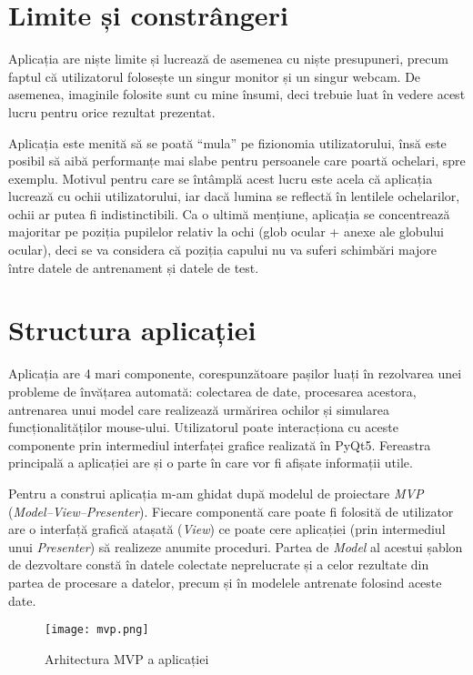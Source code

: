 \section{Limite și constrângeri}
Aplicația are niște limite și lucrează de asemenea cu niște presupuneri, precum faptul că utilizatorul folosește un singur monitor și un singur webcam.
De asemenea, imaginile folosite sunt cu mine însumi, deci trebuie luat în vedere acest lucru pentru orice rezultat prezentat.

Aplicația este menită să se poată ``mula'' pe fizionomia utilizatorului, însă este posibil să aibă performanțe mai slabe pentru persoanele care poartă ochelari, spre exemplu.
Motivul pentru care se întâmplă acest lucru este acela că aplicația lucrează cu ochii utilizatorului, iar dacă lumina se reflectă în lentilele ochelarilor, ochii ar putea fi indistinctibili.
Ca o ultimă mențiune, aplicația se concentrează majoritar pe poziția pupilelor relativ la ochi (glob ocular + anexe ale globului ocular), deci se va considera că poziția capului nu va suferi schimbări majore între datele de antrenament și datele de test.

\section{Structura aplicației}
Aplicația are 4 mari componente, corespunzătoare pașilor luați în rezolvarea unei probleme de învățarea automată: colectarea de date, procesarea acestora, antrenarea unui model care realizează urmărirea ochilor și simularea funcționalităților mouse-ului.
Utilizatorul poate interacționa cu aceste componente prin intermediul interfaței grafice realizată în PyQt5.
Fereastra principală a aplicației are și o parte în care vor fi afișate informații utile.

Pentru a construi aplicația m-am ghidat după modelul de proiectare \emph{MVP} (\emph{Model–View–Presenter}).
Fiecare componentă care poate fi folosită de utilizator are o interfață grafică atașată (\emph{View}) ce poate cere aplicației (prin intermediul unui \emph{Presenter}) să realizeze anumite proceduri.
Partea de \emph{Model} al acestui șablon de dezvoltare constă în datele colectate neprelucrate și a celor rezultate din partea de procesare a datelor, precum și în modelele antrenate folosind aceste date.

\begin{figure}[ht]
    \centering
    \texttt{[image: mvp.png]}
    \caption{Arhitectura MVP a aplicației}
\end{figure}

